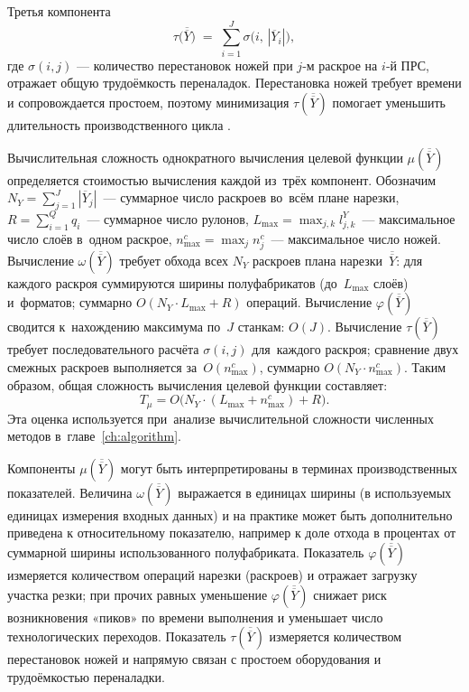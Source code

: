 Третья компонента
\[
\tau\bigl(\overline{\overline{Y}}\bigr)\;=\;\sum_{i=1}^{J} \sigma\bigl(i,\,|\overline{Y}_i|\bigr),
\]
где $\sigma(i,j)$ — количество перестановок ножей при $j$‑м раскрое на $i$‑й ПРС, отражает общую трудоёмкость переналадок.
Перестановка ножей требует времени и сопровождается простоем, поэтому минимизация $\tau(\overline{\overline{Y}})$ помогает уменьшить длительность производственного цикла \cite{cyberleninka_slitting_params,mobasher2013}.

Вычислительная сложность однократного вычисления целевой функции $\mu(\overline{\overline{Y}})$ определяется стоимостью вычисления каждой из~трёх компонент.
Обозначим $N_Y=\sum_{j=1}^{J}|\overline{Y}_j|$~--- суммарное число раскроев во~всём плане нарезки, $R=\sum_{i=1}^{Q}q_i$~--- суммарное число рулонов, $L_{\max}=\max_{j,k}l^Y_{j,k}$~--- максимальное число слоёв в~одном раскрое, $n^c_{\max}=\max_j n^c_j$~--- максимальное число ножей.
Вычисление $\omega(\overline{\overline{Y}})$ требует обхода всех $N_Y$ раскроев плана нарезки~$\overline{\overline{Y}}$: для каждого раскроя суммируются ширины полуфабрикатов (до~$L_{\max}$ слоёв) и~форматов; суммарно $O(N_Y \cdot L_{\max} + R)$ операций.
Вычисление $\varphi(\overline{\overline{Y}})$ сводится к~нахождению максимума по~$J$ станкам: $O(J)$.
Вычисление $\tau(\overline{\overline{Y}})$ требует последовательного расчёта $\sigma(i,j)$ для~каждого раскроя; сравнение двух смежных раскроев выполняется за~$O(n^c_{\max})$, суммарно $O(N_Y \cdot n^c_{\max})$.
Таким образом, общая сложность вычисления целевой функции составляет:
\begin{equation}\label{eq:objective_complexity}
T_{\mu} = O\bigl(N_Y \cdot (L_{\max} + n^c_{\max}) + R\bigr).
\end{equation}
Эта оценка используется при~анализе вычислительной сложности численных методов в~главе~\ref{ch:algorithm}.

Компоненты $\mu(\overline{\overline{Y}})$ могут быть интерпретированы в терминах производственных показателей.
Величина $\omega(\overline{\overline{Y}})$ выражается в единицах ширины (в используемых единицах измерения входных данных) и на практике может быть дополнительно приведена к относительному показателю, например к доле отхода в процентах от суммарной ширины использованного полуфабриката.
Показатель $\varphi(\overline{\overline{Y}})$ измеряется количеством операций нарезки (раскроев) и отражает загрузку участка резки; при прочих равных уменьшение $\varphi(\overline{\overline{Y}})$ снижает риск возникновения «пиков» по времени выполнения и уменьшает число технологических переходов.
Показатель $\tau(\overline{\overline{Y}})$ измеряется количеством перестановок ножей и напрямую связан с простоем оборудования и трудоёмкостью переналадки.


